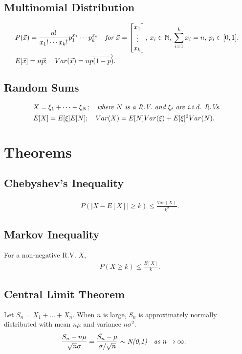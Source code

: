\documentclass{article}
\begin{document}
\subsection{Multinomial Distribution}
\begin{align*}
    & P(\vec{x}) = \frac{n!}{x_1!\cdots x_k!}p_1^{x_1}\cdots p_k^{x_k} \quad \emph{for $\vec{x} = \begin{bmatrix}
        x_1 \\ \vdots \\ x_k
    \end{bmatrix}$, $x_i\in \mathbb{N}$, $\sum_{i=1}^k x_i = n$, $p_i\in [0,1]$}. \\
    & E[\vec{x}] = n\vec{p}; \quad Var(\vec{x}) = n\overrightarrow{p(1-p)}.
\end{align*}

\subsection{Random Sums}
\begin{align*}
    & X = \xi_1 + \dots + \xi_N; \quad \emph{where $N$ is a R.V. and $\xi_i$ are i.i.d. R.Vs}. \\
    & E[X] = E[\xi]E[N]; \quad Var(X) = E[N]Var(\xi) + E[\xi]^2Var(N).
\end{align*}

\newpage
\section{Theorems}
\subsection{Chebyshev's Inequality}
\begin{align*}
    & P(|X-E[X]| \ge k) \le \frac{Var(X)}{k^2}.
\end{align*}

\subsection{Markov Inequality}
For a non-negative R.V. $X$,
\begin{align*}
    & P(X \ge k) \le \frac{E[X]}{k}.
\end{align*}

\subsection{Central Limit Theorem}
Let $S_n = X_1 + \dots + X_n$. When $n$ is large, $S_n$ is approximately normally distributed with mean $n\mu $ and variance $n\sigma^2$.
\begin{align*}
    & \frac{S_n-n\mu}{\sqrt{n}\sigma} = \frac{\bar{S_n} - \mu}{\sigma / \sqrt{n}} \sim \emph{N(0,1)} \quad \emph{as $n\to\infty$}.
\end{align*}
\end{document}
